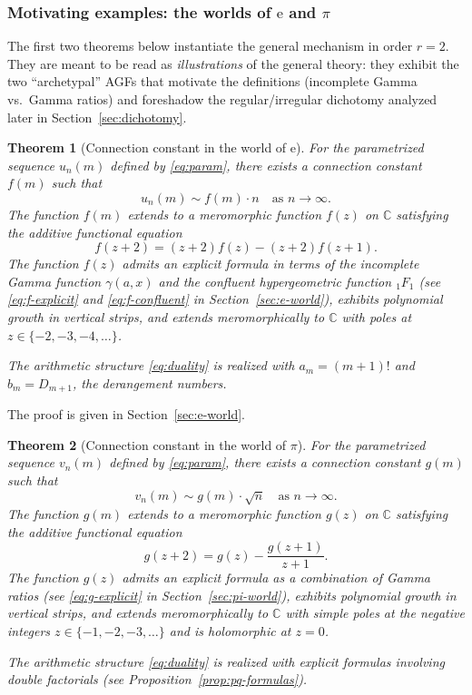 \documentclass[11pt,reqno]{amsart}
\newtheorem{theorem}{Theorem}[section]
\theoremstyle{definition}
\newcommand{\C}{\mathbb{C}}
\newcommand{\ee}{\mathrm{e}}
\numberwithin{equation}{section}
\begin{document}
\subsubsection*{Motivating examples: the worlds of $\ee$ and $\pi$}

The first two theorems below instantiate the general mechanism in order $r=2$. 
They are meant to be read as \emph{illustrations} of the general theory: they exhibit the two ``archetypal'' AGFs that motivate the
definitions (incomplete Gamma vs.\ Gamma ratios) and foreshadow the regular/irregular dichotomy analyzed later in 
Section~\ref{sec:dichotomy}.

\begin{theorem}[Connection constant in the world of $\ee$]\label{thm:e-world}
For the parametrized sequence $u_n(m)$ defined by \eqref{eq:param}, there exists a connection constant $f(m)$ such that 
\[
u_n(m) \sim f(m) \cdot n \quad \text{as } n\to\infty.
\]
The function $f(m)$ extends to a meromorphic function $f(z)$ on $\C$ satisfying the additive functional equation
\begin{equation}\label{eq:f-AFE-thm}
f(z+2) = (z+2)f(z) - (z+2)f(z+1).
\end{equation}
The function $f(z)$ admits an explicit formula in terms of the incomplete Gamma function $\gamma(a,x)$ and the confluent hypergeometric function ${}_1F_1$ (see \eqref{eq:f-explicit} and \eqref{eq:f-confluent} in Section~\ref{sec:e-world}), exhibits polynomial growth in vertical strips, and extends meromorphically to $\C$ with poles at $z \in \{-2,-3,-4,\ldots\}$.

The arithmetic structure \eqref{eq:duality} is realized with $a_m = (m+1)!$ and $b_m = D_{m+1}$, the derangement numbers.
\end{theorem}

The proof is given in Section~\ref{sec:e-world}.

\begin{theorem}[Connection constant in the world of $\pi$]\label{thm:pi-world}
For the parametrized sequence $v_n(m)$ defined by \eqref{eq:param}, there exists a connection constant $g(m)$ such that
\[
v_n(m) \sim g(m) \cdot \sqrt{n} \quad \text{as } n\to\infty.
\]
The function $g(m)$ extends to a meromorphic function $g(z)$ on $\C$ satisfying the additive functional equation
\begin{equation}\label{eq:g-AFE-thm}
g(z+2) = g(z) - \frac{g(z+1)}{z+1}.
\end{equation}
The function $g(z)$ admits an explicit formula as a combination of Gamma ratios (see \eqref{eq:g-explicit} in Section~\ref{sec:pi-world}), exhibits polynomial growth in vertical strips, and extends meromorphically to $\C$ with simple poles at the negative integers $z \in \{-1,-2,-3,\ldots\}$ and is holomorphic at $z=0$.

The arithmetic structure \eqref{eq:duality} is realized with explicit formulas involving double factorials (see Proposition~\ref{prop:pq-formulas}).
\end{theorem}
\end{document}
